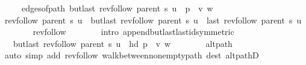 \begin{isabellebody}
\ \ \ \ \ edges{\isacharunderscore}{\kern0pt}of{\isacharunderscore}{\kern0pt}path\ {\isacharparenleft}{\kern0pt}butlast\ {\isacharparenleft}{\kern0pt}rev{\isacharunderscore}{\kern0pt}follow\ {\isacharparenleft}{\kern0pt}parent\ s{\isacharparenright}{\kern0pt}\ u{\isacharparenright}{\kern0pt}\ {\isacharat}{\kern0pt}\ p\ {\isacharat}{\kern0pt}\ {\isacharbrackleft}{\kern0pt}v{\isacharcomma}{\kern0pt}\ w{\isacharbrackright}{\kern0pt}{\isacharparenright}{\kern0pt}{\isachardoublequoteclose}\isanewline
\ \ \isamarkupfalse%
\ {\isacharminus}{\kern0pt}\isanewline
\ \ \ \ \isamarkupfalse%
\ {\isachardoublequoteopen}rev{\isacharunderscore}{\kern0pt}follow\ {\isacharparenleft}{\kern0pt}parent\ s{\isacharparenright}{\kern0pt}\ u\ {\isacharequal}{\kern0pt}\ butlast\ {\isacharparenleft}{\kern0pt}rev{\isacharunderscore}{\kern0pt}follow\ {\isacharparenleft}{\kern0pt}parent\ s{\isacharparenright}{\kern0pt}\ u{\isacharparenright}{\kern0pt}\ {\isacharat}{\kern0pt}\ {\isacharbrackleft}{\kern0pt}last\ {\isacharparenleft}{\kern0pt}rev{\isacharunderscore}{\kern0pt}follow\ {\isacharparenleft}{\kern0pt}parent\ s{\isacharparenright}{\kern0pt}\ u{\isacharparenright}{\kern0pt}{\isacharbrackright}{\kern0pt}{\isachardoublequoteclose}\isanewline
\ \ \ \ \ \ \isamarkupfalse%
\ rev{\isacharunderscore}{\kern0pt}follow{\isacharparenleft}{\kern0pt}{}{\isacharparenright}{\kern0pt}\isanewline
\ \ \ \ \ \ \isamarkupfalse%
\ {\isacharparenleft}{\kern0pt}intro\ append{\isacharunderscore}{\kern0pt}butlast{\isacharunderscore}{\kern0pt}last{\isacharunderscore}{\kern0pt}id{\isacharbrackleft}{\kern0pt}symmetric{\isacharbrackright}{\kern0pt}{\isacharparenright}{\kern0pt}\isanewline
\ \ \ \ \isamarkupfalse%
\ \isamarkupfalse%
\ {\isachardoublequoteopen}{\isachardot}{\kern0pt}{\isachardot}{\kern0pt}{\isachardot}{\kern0pt}\ {\isacharequal}{\kern0pt}\ butlast\ {\isacharparenleft}{\kern0pt}rev{\isacharunderscore}{\kern0pt}follow\ {\isacharparenleft}{\kern0pt}parent\ s{\isacharparenright}{\kern0pt}\ u{\isacharparenright}{\kern0pt}\ {\isacharat}{\kern0pt}\ {\isacharbrackleft}{\kern0pt}hd\ {\isacharparenleft}{\kern0pt}p\ {\isacharat}{\kern0pt}\ {\isacharbrackleft}{\kern0pt}v{\isacharcomma}{\kern0pt}\ w{\isacharbrackright}{\kern0pt}{\isacharparenright}{\kern0pt}{\isacharbrackright}{\kern0pt}{\isachardoublequoteclose}\isanewline
\ \ \ \ \ \ \isamarkupfalse%
\ alt{\isacharunderscore}{\kern0pt}path\isanewline
\ \ \ \ \ \ \isamarkupfalse%
\ {\isacharparenleft}{\kern0pt}auto\ simp\ add{\isacharcolon}{\kern0pt}\ rev{\isacharunderscore}{\kern0pt}follow{\isacharparenleft}{\kern0pt}{}{\isacharparenright}{\kern0pt}\ walk{\isacharunderscore}{\kern0pt}between{\isacharunderscore}{\kern0pt}nonempty{\isacharunderscore}{\kern0pt}path{\isacharparenleft}{\kern0pt}{}{\isacharparenright}{\kern0pt}\ dest{\isacharcolon}{\kern0pt}\ alt{\isacharunderscore}{\kern0pt}pathD{\isacharparenleft}{\kern0pt}{}{\isacharparenright}{\kern0pt}{\isacharparenright}{\kern0pt}\isanewline

\end{isabellebody}
